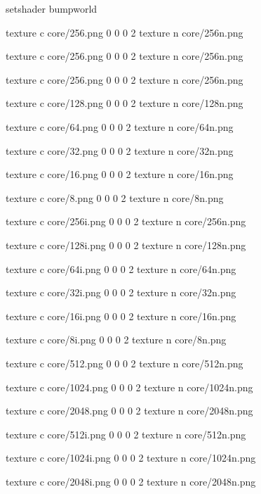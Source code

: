setshader bumpworld

texture c core/256.png 0 0 0 2
texture n core/256n.png

texture c core/256.png 0 0 0 2
texture n core/256n.png

texture c core/256.png 0 0 0 2
texture n core/256n.png

texture c core/128.png 0 0 0 2
texture n core/128n.png

texture c core/64.png 0 0 0 2
texture n core/64n.png

texture c core/32.png 0 0 0 2
texture n core/32n.png

texture c core/16.png 0 0 0 2
texture n core/16n.png

texture c core/8.png 0 0 0 2
texture n core/8n.png

texture c core/256i.png 0 0 0 2
texture n core/256n.png

texture c core/128i.png 0 0 0 2
texture n core/128n.png

texture c core/64i.png 0 0 0 2
texture n core/64n.png

texture c core/32i.png 0 0 0 2
texture n core/32n.png

texture c core/16i.png 0 0 0 2
texture n core/16n.png

texture c core/8i.png 0 0 0 2
texture n core/8n.png

texture c core/512.png 0 0 0 2
texture n core/512n.png

texture c core/1024.png 0 0 0 2
texture n core/1024n.png

texture c core/2048.png 0 0 0 2
texture n core/2048n.png

texture c core/512i.png 0 0 0 2
texture n core/512n.png

texture c core/1024i.png 0 0 0 2
texture n core/1024n.png

texture c core/2048i.png 0 0 0 2
texture n core/2048n.png